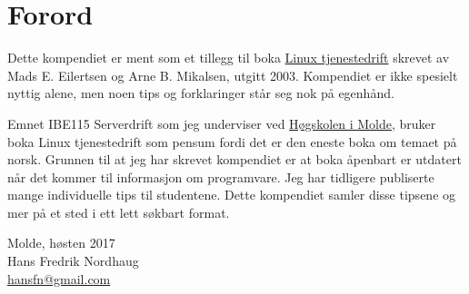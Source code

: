 \chapter*{Forord} 

Dette kompendiet er ment som et tillegg til boka 
\href{http://www2.tisip.no/boker/ltj/}{Linux tjenestedrift} \cite{book:linux_tjenestedrift}
skrevet av Mads E. Eilertsen og Arne B. Mikalsen, utgitt 2003. Kompendiet er ikke spesielt nyttig alene, men
noen tips og forklaringer står seg nok på egenhånd.

Emnet IBE115 Serverdrift som jeg underviser ved \href{http://www.himolde.no/}{Høgskolen i Molde}, bruker
boka Linux tjenestedrift som pensum fordi det er den eneste boka om temaet på norsk.
Grunnen til at jeg har skrevet kompendiet er at boka åpenbart er utdatert når det kommer til informasjon 
om programvare. Jeg har tidligere publiserte mange individuelle tips til studentene. Dette kompendiet
samler disse tipsene og mer på et sted i ett lett søkbart format.

\begin{center}
Molde, høsten 2017\\
Hans Fredrik Nordhaug\\
\href{mailto:hansfn@gmail.com}{hansfn@gmail.com}
\end{center}



